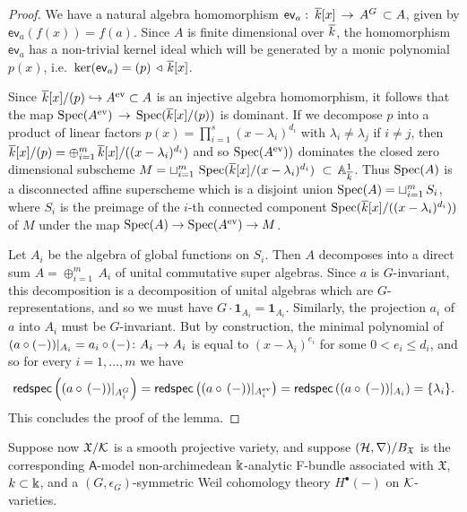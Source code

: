 \documentclass[twoside,leqno]{article}
\numberwithin{equation}{section}
\theoremstyle{plain}
\theoremstyle{definition}
\begin{document}
\begin{proof}
We have a natural algebra homomorphism $\mathsf{ev}_{a} \, \colon \,\overline{k}[x] \, \to \, A^{G} \, \subset  A$, given by $\mathsf{ev}_{a}(f(x)) = f(a)$. Since $A$ is finite dimensional over $\overline{k}$, the homomorphism $\mathsf{ev}_{a}$ has a non-trivial kernel ideal which will be generated by a monic polynomial $p(x)$, i.e.\ $\ker(\mathsf{ev}_{a}) = (p) \, \triangleleft \, \overline{k}[x]$. 

Since 
$\overline{k}[x]/(p)  \hookrightarrow A^{\mathrm{ev}} \subset A$ is an injective algebra homomorphism, it follows that  the map 
$\operatorname{Spec}(A^{\mathrm{ev}}) \, \to \,  \operatorname{Spec} (\overline{k}[x]/(p))$ is dominant. If we decompose 
$p$ into a product of linear factors $p(x) = \prod_{i=1}^{s} (x-\lambda_{i})^{d_{i}}$ with $\lambda_{i} \neq \lambda_{j}$ if $i \neq j$,
then $\overline{k}[x]/(p) = \oplus_{i=1}^{m} \, \overline{k}[x]/((x-\lambda_{i})^{d_{i}})$ and so $\operatorname{Spec} (A^{\mathrm{ev}}))$ dominates the closed zero dimensional subscheme $M  = \sqcup_{i = 1}^{m} \, \operatorname{Spec}(\overline{k}[x]/(x-\lambda_{i})^{d_{i}}) \ \subset \, \mathbb{A}^1_{\overline{k}}$. Thus $\operatorname{Spec}(A)$ is a disconnected affine superscheme which is a disjoint union $\operatorname{Spec}(A) = \sqcup_{i = 1}^{m} \, S_{i}$, where $S_{i}$ is the preimage of  the $i$-th connected component $\operatorname{Spec}(\overline{k}[x]/((x-\lambda_{i})^{d_{i}}))$ of $M$ under the map \linebreak 
$\operatorname{Spec}(A) \to \operatorname{Spec}(A^{\mathrm{ev}}) \to M$. 

 
Let $A_{i}$ be the algebra of global functions on $S_{i}$. Then $A$ decomposes into a direct sum $A = \oplus_{i=1}^{m} \, A_{i}$ of unital 
commutative super algebras. Since $a$ is $G$-invariant, this decomposition is a decomposition of unital algebras which are $G$-representations, and so we must have  $G\cdot \mathbf{1}_{A_{i}} = \mathbf{1}_{A_{i}}$. Similarly, the projection $a_{i}$ of $a$ into $A_{i}$ must be $G$-invariant. But by construction, the minimal polynomial of 
$(a\circ (-))|_{A_{i}} = a_{i}\circ (-) \colon A_{i} \to A_{i}$ is equal to 
$(x-\lambda_{i})^{e_{i}}$ for some $0< e_{i} \leq d_{i}$, and so 
for every $i = 1, \ldots, m$ we have 
\[
\mathsf{redspec}\left((a\circ \, (-))|_{A_{i}^{G}}\right) = \mathsf{redspec}\left((a\circ \, (-))|_{A_{i}^{\mathrm{ev}}}\right) = \mathsf{redspec}\left((a\circ \, (-))|_{A_{i}}\right) = \{\lambda_{i}\}.
\]
This concludes the proof of the lemma. 
\end{proof}

\medskip




Suppose now  $\mathfrak{X}/\mathcal K$ is a smooth projective variety, and 
suppose $(\mathcal H,\nabla)/B_{\mathfrak{X}}$ is the corresponding  $\mathsf{A}$-model non-archimedean $\Bbbk$-analytic F-bundle associated with 
$\mathfrak{X}$, $k \subset \Bbbk$, and a $(G,\epsilon_{G})$-symmetric Weil cohomology theory $H^{\bullet}(-)$  on $\mathcal K$-varieties.
\end{document}
